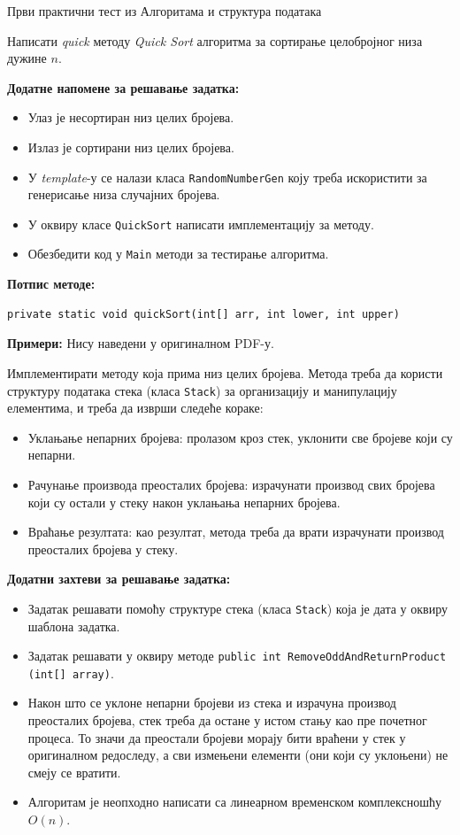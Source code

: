 
Први практични тест из Алгоритама и структура података

Написати \textit{quick} методу \textit{Quick Sort} алгоритма за сортирање целобројног низа дужине $n$.

\textbf{Додатне напомене за решавање задатка:}
\begin{itemize}
	\item Улаз је несортиран низ целих бројева.
	\item Излаз је сортирани низ целих бројева.
	\item У \textit{template}-у се налази класа \texttt{RandomNumberGen} коју треба искористити за генерисање низа случајних бројева.
	\item У оквиру класе \texttt{QuickSort} написати имплементацију за методу.
	\item Обезбедити код у \texttt{Main} методи за тестирање алгоритма.
\end{itemize}

\textbf{Потпис методе:}
\begin{Verbatim}[fontsize=\small]
private static void quickSort(int[] arr, int lower, int upper)
\end{Verbatim}

\textbf{Примери:}
Нису наведени у оригиналном PDF-у.

Имплементирати методу која прима низ целих бројева. Метода треба да користи структуру података стека (класа \texttt{Stack}) за организацију и манипулацију елементима, и треба да изврши следеће кораке:
\begin{itemize}
	\item Уклањање непарних бројева: пролазом кроз стек, уклонити све бројеве који су непарни.
	\item Рачунање производа преосталих бројева: израчунати производ свих бројева који су остали у стеку након уклањања непарних бројева.
	\item Враћање резултата: као резултат, метода треба да врати израчунати производ преосталих бројева у стеку.
\end{itemize}

\textbf{Додатни захтеви за решавање задатка:}
\begin{itemize}
	\item Задатак решавати помоћу структуре стека (класа \texttt{Stack}) која је дата у оквиру шаблона задатка.
	\item Задатак решавати у оквиру методе \texttt{public int RemoveOddAndReturnProduct (int[] array)}.
	\item Након што се уклоне непарни бројеви из стека и израчуна производ преосталих бројева, стек треба да остане у истом стању као пре почетног процеса. То значи да преостали бројеви морају бити враћени у стек у оригиналном редоследу, а сви измењени елементи (они који су уклоњени) не смеју се вратити.
	\item Алгоритам је неопходно написати са линеарном временском комплексношћу $O(n)$.
\end{itemize}

